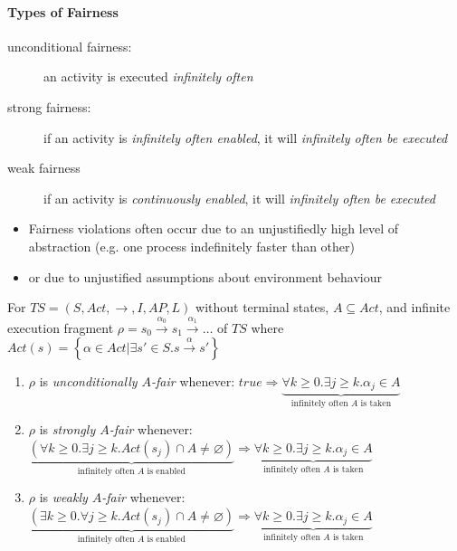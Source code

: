 \documentclass[a4paper, 10pt]{article}
\begin{document}
\paragraph*{Types of Fairness}
\begin{description}
    \item[unconditional fairness:] an activity is executed \emph{infinitely often}
    \item[strong fairness:] if an activity is \emph{infinitely often enabled}, it will \emph{infinitely often be executed}
    \item[weak fairness] if an activity is \emph{continuously enabled}, it will \emph{infinitely often be executed}
\end{description}
\begin{itemize}
    \item Fairness violations often occur due to an unjustifiedly high level of abstraction (e.g. one process indefinitely faster than other)
    \item or due to unjustified assumptions about environment behaviour
\end{itemize}
\begin{shaded}
    For $TS=(S,Act,\to,I,AP,L)$ without terminal states, $A\subseteq Act$, and infinite execution fragment $\rho=s_0\overset{\alpha_0}{\longrightarrow}s_1\overset{\alpha_1}{\longrightarrow}\dots$ of $TS$ {\tiny where $Act(s) = \left\{ \alpha\in Act | \exists s' \in S. s\overset{\alpha}{\longrightarrow}s'\right\}$}
    \begin{enumerate}
        \item $\rho$ is \emph{unconditionally $A$-fair} whenever: $true\Rightarrow \underset{\textrm{infinitely often } A\textrm{ is taken}}{\underbrace{\forall k\geq0.\exists j\geq k.\alpha_j\in A}}$
        \item $\rho$ is \emph{strongly $A$-fair} whenever: $\underset{\textrm{infinitely often } A\textrm{ is enabled}}{\underbrace{(\forall k\geq0.\exists j\geq k.Act(s_j)\cap A\not=\varnothing)}}\Rightarrow \underset{\textrm{infinitely often } A\textrm{ is taken}}{\underbrace{\forall k\geq0.\exists j\geq k.\alpha_j\in A}}$
        \item $\rho$ is \emph{weakly $A$-fair} whenever: $\underset{\textrm{infinitely often } A\textrm{ is enabled}}{\underbrace{(\exists k\geq0.\forall j\geq k.Act(s_j)\cap A\not=\varnothing)}}\Rightarrow \underset{\textrm{infinitely often } A\textrm{ is taken}}{\underbrace{\forall k\geq0.\exists j\geq k.\alpha_j\in A}}$
    \end{enumerate}
\end{shaded}
\end{document}
